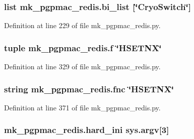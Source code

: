 \hypertarget{namespacemk__pgpmac__redis_a961bfabfbdcbf5b749f6e6ecdc733619}{
\subsubsection[{bi\-\_\-list}]{\setlength{\rightskip}{0pt plus 5cm}list mk\-\_\-pgpmac\-\_\-redis.\-bi\-\_\-list \mbox{[}\char`\"{}Cryo\-Switch\char`\"{}\mbox{]}}}\label{namespacemk__pgpmac__redis_a961bfabfbdcbf5b749f6e6ecdc733619}


Definition at line 229 of file mk\-\_\-pgpmac\-\_\-redis.\-py.

\hypertarget{namespacemk__pgpmac__redis_a057fe7457503e0de97edcf855591ed58}{
\subsubsection[{f}]{\setlength{\rightskip}{0pt plus 5cm}tuple mk\-\_\-pgpmac\-\_\-redis.\-f \char`\"{}H\-S\-E\-T\-N\-X\char`\"{}}}\label{namespacemk__pgpmac__redis_a057fe7457503e0de97edcf855591ed58}


Definition at line 329 of file mk\-\_\-pgpmac\-\_\-redis.\-py.

\hypertarget{namespacemk__pgpmac__redis_a654b54ba0758b8b84516938260851129}{
\subsubsection[{fnc}]{\setlength{\rightskip}{0pt plus 5cm}string mk\-\_\-pgpmac\-\_\-redis.\-fnc \char`\"{}H\-S\-E\-T\-N\-X\char`\"{}}}\label{namespacemk__pgpmac__redis_a654b54ba0758b8b84516938260851129}


Definition at line 371 of file mk\-\_\-pgpmac\-\_\-redis.\-py.

\hypertarget{namespacemk__pgpmac__redis_a5864d9c27cbe61534756880cbfebe4f1}{
\subsubsection[{hard\-\_\-ini}]{\setlength{\rightskip}{0pt plus 5cm}mk\-\_\-pgpmac\-\_\-redis.\-hard\-\_\-ini sys.\-argv\mbox{[}3\mbox{]}}}\label{namespacemk__pgpmac__redis_a5864d9c27cbe61534756880cbfebe4f1}


